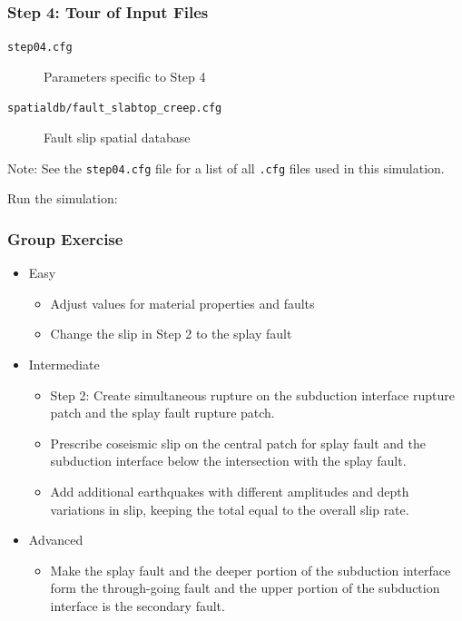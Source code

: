\documentclass[aspectratio=169]{beamer}
\begin{document}
\begin{frame}
  \frametitle{Step 4: Tour of Input Files}
  \summary{}

  \begin{description}
  \item[{\tt step04.cfg}] Parameters specific to Step 4
  \item[{\tt spatialdb/fault\_slabtop\_creep.cfg}] Fault slip spatial database
  \end{description}
  
  \vfill
  Note: See the {\tt step04.cfg} file for a list of all {\tt .cfg}
  files used in this simulation.
  \vfill

  Run the simulation:\\

\end{frame}




\begin{frame}
  \frametitle{Group Exercise}
  \summary{}
 

  \begin{itemize}
  \item Easy
    \begin{itemize}
    \item Adjust values for material properties and faults
    \item Change the slip in Step 2 to the splay fault
    \end{itemize}
  \item Intermediate
    \begin{itemize}
    \item Step 2: Create simultaneous rupture on the subduction
      interface rupture patch and the splay fault rupture patch.
    \item Prescribe coseismic slip on the central patch for splay fault
      and the subduction interface below the intersection with the splay fault.
    \item Add additional earthquakes with different amplitudes and
      depth variations in slip, keeping the total equal to the overall
      slip rate.
    \end{itemize}
  \item Advanced
    \begin{itemize}
    \item Make the splay fault and the deeper portion of the
      subduction interface form the through-going fault and the upper
      portion of the subduction interface is the secondary fault.
    \end{itemize}
  \end{itemize}

\end{frame}


\end{document}
